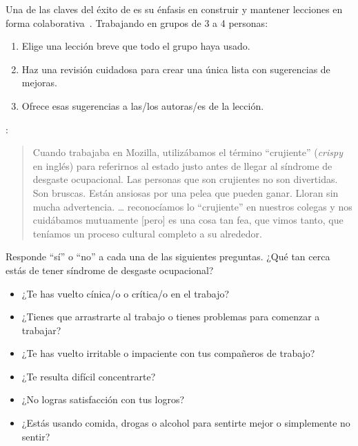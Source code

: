 
Una de las claves del éxito de 
es su énfasis en construir y mantener lecciones en forma colaborativa~\cite{Wils2016,Deve2018}.
Trabajando en grupos de 3 a 4 personas:

\begin{enumerate}

\item
  Elige una lección breve que todo el grupo haya usado.

\item
  Haz una revisión cuidadosa para crear una única lista con sugerencias de mejoras.

\item
  Ofrece esas sugerencias a las/los autoras/es de la lección.

\end{enumerate}


:

\begin{quote}
  Cuando trabajaba en Mozilla,
  utilizábamos el término ``crujiente'' (\emph{crispy} en inglés) para referirnos al estado justo antes de llegar al síndrome de desgaste ocupacional.
  Las personas que son crujientes no son divertidas.
  Son bruscas.
  Están ansiosas por una pelea que pueden ganar.
  Lloran sin mucha advertencia.
  {\ldots} reconocíamos lo ``crujiente'' en  nuestros colegas y nos cuidábamos  mutuamente
  [pero] es una cosa tan fea, que vimos tanto, que teníamos un proceso cultural completo a su alrededor.
\end{quote}

\noindent
Responde ``sí'' o ``no'' a cada una de las siguientes preguntas.
¿Qué tan cerca estás de tener síndrome de desgaste ocupacional?

\begin{itemize}
\item ¿Te has vuelto cínica/o o crítica/o en el trabajo?
\item ¿Tienes que arrastrarte al trabajo o tienes problemas para comenzar a trabajar?
\item ¿Te has vuelto irritable o impaciente con tus compañeros de trabajo?
\item ¿Te resulta difícil concentrarte?
\item ¿No logras satisfacción con tus logros?
\item ¿Estás usando comida, drogas o alcohol para sentirte mejor o simplemente no sentir?
\end{itemize}
